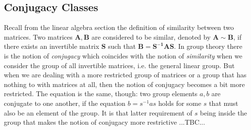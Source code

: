 





\subsection{Conjugacy Classes}
Recall from the linear algebra section the definition of similarity between two matrices. Two matrices $\mathbf{A,B}$ are considered to be similar, denoted by $\mathbf{A} \sim \mathbf{B}$, if there exists an invertible matrix $\mathbf{S}$ such that $\mathbf{B} = \mathbf{S^{-1} A S}$. In group theory there is the notion of \emph{conjugacy} which coincides with the notion of \emph{similarity} when we consider the group of all invertible matrices, i.e. the general linear group. But when we are dealing with a more restricted group of matrices or a group that has nothing to with matrices at all, then the notion of conjugacy becomes a bit more restricted. The equation is the same, though: two group elements $a,b$ are conjugate to one another, if the equation $b = s^{-1} a s$ holds for some $s$ that must also be an element of the group. It is that latter requirement of $s$ being inside the group that makes the notion of conjugacy more restrictive ...TBC...



